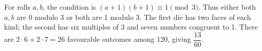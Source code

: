 For rolls $a,b$, the condition is $(a+1)(b+1)\equiv1\pmod3$. Thus either both $a,b$ are 0 modulo 3 or both are 1 modulo 3. The first die has two faces of each kind; the second has six multiples of 3 and seven numbers congruent to 1. There are $2\cdot6+2\cdot7=26$ favourable outcomes among 120, giving $\boxed{\dfrac{13}{60}}$.
